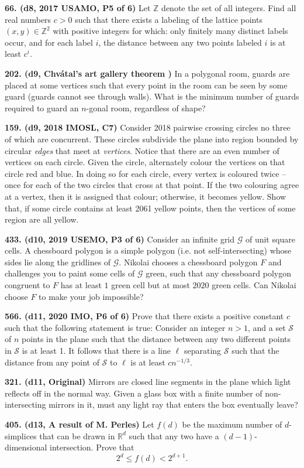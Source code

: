 \documentclass{article}
\begin{document}
\textbf{66. (\color{red}d8\color{black}, 2017 USAMO, P5 of 6)} Let $\mathbb{Z}$ denote the set of all integers. Find all real numbers $c > 0$ such that there exists a labeling of the lattice points $( x, y ) \in \mathbb{Z}^2$ with positive integers for which: only finitely many distinct labels occur, and for each label $i$, the distance between any two points labeled $i$ is at least $c^i$.

\textbf{202. (\color{red}d9\color{black}, Chvátal's art gallery theorem  )} In a polygonal room, guards are placed at some vertices such that every point in the room can be seen by some guard (guards cannot see through walls). What is the minimum number of guards required to guard an $n$-gonal room, regardless of shape?

\textbf{159. (\color{red}d9\color{black}, 2018 IMOSL, C7)} Consider 2018 pairwise crossing circles no three of which are concurrent. These circles subdivide the plane into region bounded by circular \emph{edges} that meet at \emph{vertices}. Notice that there are an even number of vertices on each circle. Given the circle, alternately colour the vertices on that circle red and blue. In doing so for each circle, every vertex is coloured twice -- once for each of the two circles that cross at that point. If the two colouring agree at a vertex, then it is assigned that colour; otherwise, it becomes yellow. Show that, if some circle contains at least 2061 yellow points, then the vertices of some region are all yellow.

\textbf{433. (\color{red}d10\color{black}, 2019 USEMO, P3 of 6)} Consider an infinite grid $\mathcal G$ of unit square cells. A chessboard polygon is a simple polygon (i.e. not self-intersecting) whose sides lie along the gridlines of $\mathcal G$. Nikolai chooses a chessboard polygon $F$ and challenges you to paint some cells of $\mathcal G$ green, such that any chessboard polygon congruent to $F$ has at least $1$ green cell but at most $2020$ green cells. Can Nikolai choose $F$ to make your job impossible?

\textbf{566. (\color{red}d11\color{black}, 2020 IMO, P6 of 6)} Prove that there exists a positive constant $c$ such that the following statement is true:
Consider an integer $n > 1$, and a set $\mathcal S$ of $n$ points in the plane such that the distance between any two different points in $\mathcal S$ is at least 1. It follows that there is a line $\ell$ separating $\mathcal S$ such that the distance from any point of $\mathcal S$ to $\ell$ is at least $cn^{-1/3}$.

\textbf{321. (\color{red}d11\color{black}, Original)} Mirrors are closed line segments in the plane which light reflects off in the normal way. Given a glass box with a finite number of non-intersecting mirrors in it, must any light ray that enters the box eventually leave?

\textbf{405. (\color{red}d13\color{black}, A result of M. Perles)} Let $f(d)$ be the maximum number of $d$-simplices that can be drawn in $\mathbb{R}^d$ such that any two have a $(d-1)$-dimensional intersection. Prove that $$2^d \leq f(d) < 2^{d+1}.$$
\end{document}
